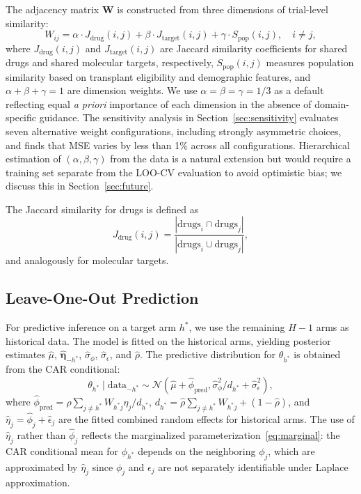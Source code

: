 \documentclass[12pt]{article}
\newcommand{\bW}{\mathbf{W}}
\begin{document}
The adjacency matrix $\bW$ is constructed from three dimensions of trial-level similarity:
\begin{equation}
\label{eq:similarity}
W_{ij} = \alpha \cdot J_{\text{drug}}(i,j) + \beta \cdot J_{\text{target}}(i,j) + \gamma \cdot S_{\text{pop}}(i,j), \quad i \neq j,
\end{equation}
where $J_{\text{drug}}(i,j)$ and $J_{\text{target}}(i,j)$ are Jaccard similarity coefficients for shared drugs and shared molecular targets, respectively, $S_{\text{pop}}(i,j)$ measures population similarity based on transplant eligibility and demographic features, and $\alpha + \beta + \gamma = 1$ are dimension weights. We use $\alpha = \beta = \gamma = 1/3$ as a default reflecting equal \emph{a priori} importance of each dimension in the absence of domain-specific guidance. The sensitivity analysis in Section~\ref{sec:sensitivity} evaluates seven alternative weight configurations, including strongly asymmetric choices, and finds that MSE varies by less than 1\% across all configurations. Hierarchical estimation of $(\alpha, \beta, \gamma)$ from the data is a natural extension but would require a training set separate from the LOO-CV evaluation to avoid optimistic bias; we discuss this in Section~\ref{sec:future}.

The Jaccard similarity for drugs is defined as
\begin{equation}
\label{eq:jaccard}
J_{\text{drug}}(i,j) = \frac{|\text{drugs}_i \cap \text{drugs}_j|}{|\text{drugs}_i \cup \text{drugs}_j|},
\end{equation}
and analogously for molecular targets.

\subsection{Leave-One-Out Prediction}
\label{sec:loo_prediction}

For predictive inference on a target arm $h^*$, we use the remaining $H - 1$ arms as historical data. The model is fitted on the historical arms, yielding posterior estimates $\hat{\mu}$, $\hat{\boldsymbol{\eta}}_{-h^*}$, $\hat{\sigma}_\phi$, $\hat{\sigma}_\epsilon$, and $\hat{\rho}$. The predictive distribution for $\theta_{h^*}$ is obtained from the CAR conditional:
\begin{equation}
\label{eq:predictive}
\theta_{h^*} \mid \text{data}_{-h^*} \sim \mathcal{N}\left(\hat{\mu} + \hat{\phi}_{\text{pred}}, \hat{\sigma}_\phi^2 / d_{h^*} + \hat{\sigma}_\epsilon^2\right),
\end{equation}
where $\hat{\phi}_{\text{pred}} = \hat{\rho} \sum_{j \neq h^*} W_{h^* j} \hat{\eta}_j / d_{h^*}$, $d_{h^*} = \hat{\rho} \sum_{j \neq h^*} W_{h^* j} + (1 - \hat{\rho})$, and $\hat{\eta}_j = \hat{\phi}_j + \hat{\epsilon}_j$ are the fitted combined random effects for historical arms. The use of $\hat{\eta}_j$ rather than $\hat{\phi}_j$ reflects the marginalized parameterization~\eqref{eq:marginal}: the CAR conditional mean for $\phi_{h^*}$ depends on the neighboring $\phi_j$, which are approximated by $\hat{\eta}_j$ since $\phi_j$ and $\epsilon_j$ are not separately identifiable under Laplace approximation.
\end{document}
